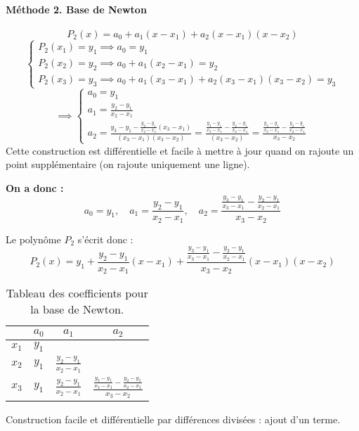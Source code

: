 \documentclass[oneside]{book}
\begin{document}
\paragraph{Méthode 2. Base de Newton}

\[
P_2(x) = a_0 + a_1 (x-x_1) + a_2 (x-x_1)(x-x_2)
\]
\[
\begin{cases}
P_2(x_1) = y_1 \implies a_0 = y_1 \\
P_2(x_2) = y_2 \implies a_0 + a_1 (x_2-x_1) = y_2 \\
P_2(x_3) = y_3 \implies a_0 + a_1 (x_3-x_1) + a_2 (x_3-x_1)(x_3-x_2) = y_3
\end{cases}
\]
\[
\implies
\begin{cases}
a_0 = y_1 \\
a_1 = \frac{y_2-y_1}{x_2-x_1} \\
a_2 = \frac{y_3 - y_1 - \frac{y_2-y_1}{x_2-x_1} (x_3-x_1)}{(x_3-x_1)(x_3-x_2)} = \frac{\frac{y_3-y_1}{x_3-x_1} - \frac{y_2-y_1}{x_2-x_1}}{(x_3-x_2)} = \frac{\frac{y_3-y_1}{x_3-x_1} - \frac{y_2-y_1}{x_2-x_1}}{x_3-x_2}
\end{cases}
\]
Cette construction est différentielle et facile à mettre à jour quand on rajoute un point supplémentaire (on rajoute uniquement une ligne).

\textbf{On a donc :}
\[
a_0 = y_1, \quad a_1 = \frac{y_2-y_1}{x_2-x_1}, \quad a_2 = \frac{\frac{y_3-y_1}{x_3-x_1} - \frac{y_2-y_1}{x_2-x_1}}{x_3-x_2}
\]

Le polynôme $P_2$ s'écrit donc :
\[
P_2(x) = y_1 + \frac{y_2-y_1}{x_2-x_1} (x-x_1) + \frac{\frac{y_3-y_1}{x_3-x_1} - \frac{y_2-y_1}{x_2-x_1}}{x_3-x_2} (x-x_1)(x-x_2)
\]

\begin{table}[H]
    \centering
    \begin{tabular}{|c|c|c|c|}
        \hline
         & $a_0$ & $a_1$ & $a_2$ \\
        \hline
        $x_1$ & $y_1$ & &  \\
        \hline
        $x_2$ & $y_1$ & $\frac{y_2-y_1}{x_2-x_1}$ &  \\
        \hline
        $x_3$ & $y_1$ & $\frac{y_2-y_1}{x_2-x_1}$ & $\frac{\frac{y_3-y_1}{x_3-x_1} - \frac{y_2-y_1}{x_2-x_1}}{x_3-x_2}$ \\
        \hline
    \end{tabular}
    \caption{Tableau des coefficients pour la base de Newton.}
    \label{tab:newton_coeffs}
\end{table}
Construction facile et différentielle par différences divisées : ajout d'un terme.
\end{document}
